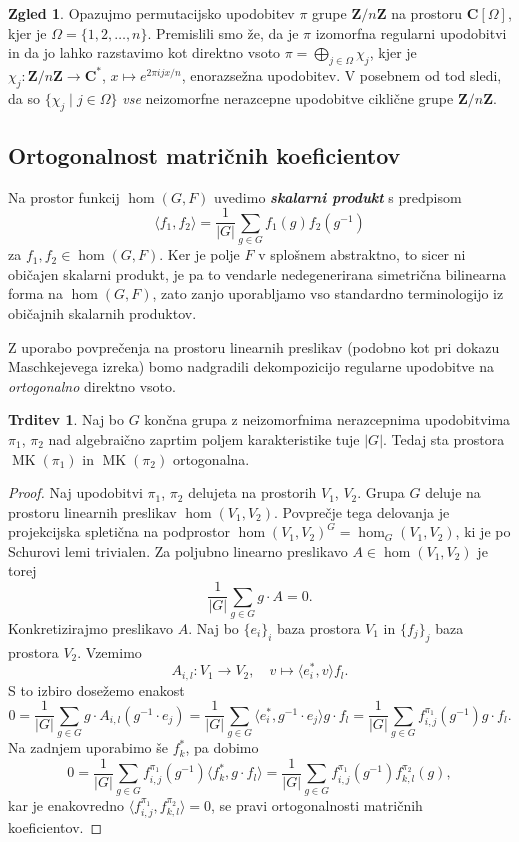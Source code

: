\documentclass[11pt]{book}
\def\ZZ{\mathbf{Z}}
\def\CC{\mathbf{C}}
\DeclareMathOperator\MK{MK}
\def\definicija{\color{rdeca}\bf\em}
\theoremstyle{definition}
\theoremstyle{zgled}
\newtheorem*{zgled}{Zgled}
\theoremstyle{odprtproblem}
\theoremstyle{domacanaloga}
\newenvironment{dokaz}
    {\color{siva}\begin{proof}}
    {\end{proof}}
\theoremstyle{izrek}
\newtheorem*{trditev}{Trditev}
\begin{document}
\begin{zgled}
Opazujmo permutacijsko upodobitev $\pi$ grupe $\ZZ/n\ZZ$ na prostoru $\CC[\Omega]$, kjer je $\Omega = \{ 1, 2, \dots, n \}$. Premislili smo že, da je $\pi$ izomorfna regularni upodobitvi in da jo lahko razstavimo kot direktno vsoto $\pi = \bigoplus_{j \in \Omega} \chi_j$, kjer je $\chi_j \colon \ZZ/n\ZZ \to \CC^*$, $x \mapsto e^{2 \pi i j x / n}$, enorazsežna upodobitev. V posebnem od tod sledi, da so $\{ \chi_j \mid j \in \Omega \}$ \emph{vse} neizomorfne nerazcepne upodobitve ciklične grupe $\ZZ/n\ZZ$.
\end{zgled}

\subsection{Ortogonalnost matričnih koeficientov}

Na prostor funkcij $\hom(G,F)$ uvedimo {\definicija skalarni produkt} s predpisom
\[
    \langle f_1, f_2 \rangle = \frac{1}{|G|} \sum_{g \in G} f_1(g) f_2(g^{-1})
\]
za $f_1, f_2 \in \hom(G,F)$. Ker je polje $F$ v splošnem abstraktno, to sicer ni običajen skalarni produkt, je pa to vendarle nedegenerirana simetrična bilinearna forma na $\hom(G,F)$, zato zanjo uporabljamo vso standardno terminologijo iz običajnih skalarnih produktov.

Z uporabo povprečenja na prostoru linearnih preslikav (podobno kot pri dokazu Maschkejevega izreka) bomo nadgradili dekompozicijo regularne upodobitve na \emph{ortogonalno} direktno vsoto.

\begin{trditev}
Naj bo $G$ končna grupa z neizomorfnima nerazcepnima upodobitvima $\pi_1$, $\pi_2$ nad algebraično zaprtim poljem karakteristike tuje $|G|$. Tedaj sta prostora $\MK(\pi_1)$ in $\MK(\pi_2)$ ortogonalna.
\end{trditev}
\begin{dokaz}
Naj upodobitvi $\pi_1$, $\pi_2$ delujeta na prostorih $V_1$, $V_2$. Grupa $G$ deluje na prostoru linearnih preslikav $\hom(V_1, V_2)$. Povprečje tega delovanja je projekcijska spletična na podprostor $\hom(V_1, V_2)^G = \hom_G(V_1, V_2)$, ki je po Schurovi lemi trivialen. Za poljubno linearno preslikavo $A \in \hom(V_1, V_2)$ je torej
\[
    \frac{1}{|G|} \sum_{g \in G} g \cdot A = 0.
\]
Konkretizirajmo preslikavo $A$. Naj bo $\{ e_i \}_i$ baza prostora $V_1$ in $\{ f_j \}_j$ baza prostora $V_2$. Vzemimo
\[
    A_{i,l} \colon V_1 \to V_2, \quad
    v \mapsto \langle e_i^*, v \rangle f_l.
\]
S to izbiro dosežemo enakost
\[
    0 = \frac{1}{|G|} \sum_{g \in G} g \cdot A_{i,l}(g^{-1} \cdot e_j) =
    \frac{1}{|G|} \sum_{g \in G} \langle e_i^*, g^{-1} \cdot e_j \rangle g \cdot f_l =
    \frac{1}{|G|} \sum_{g \in G} f_{i,j}^{\pi_1}(g^{-1}) g \cdot f_l.
\]
Na zadnjem uporabimo še $f_k^*$, pa dobimo
\[
    0 = \frac{1}{|G|} \sum_{g \in G} f_{i,j}^{\pi_1}(g^{-1}) \langle f_k^*, g \cdot f_l \rangle =
    \frac{1}{|G|} \sum_{g \in G} f_{i,j}^{\pi_1}(g^{-1}) f_{k,l}^{\pi_2}(g),
\]
kar je enakovredno $\langle f_{i,j}^{\pi_1}, f_{k,l}^{\pi_2} \rangle = 0$, se pravi ortogonalnosti matričnih koeficientov.
\end{dokaz}
\end{document}
